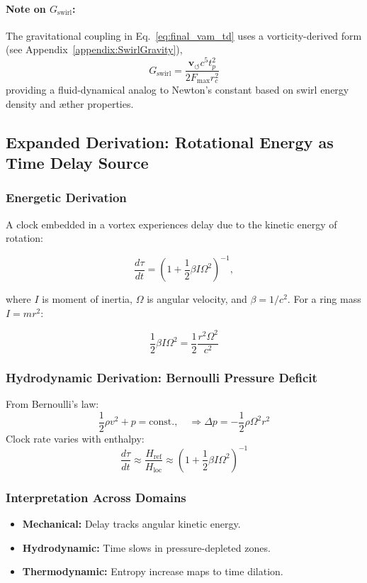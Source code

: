\documentclass[preprint]{revtex4-2}
\begin{document}
\paragraph{Note on $G_\text{swirl}$:}
The gravitational coupling in Eq.~\eqref{eq:final_vam_td} uses a vorticity-derived form (see Appendix~\ref{appendix:SwirlGravity}),
\[
    G_\text{swirl} = \frac{\mathbf{v}_{\scriptscriptstyle\boldsymbol{\circlearrowleft}} c^5 t_p^2}{2 F_{\text{max}} r_c^2}
\]
providing a fluid-dynamical analog to Newton's constant based on swirl energy density and æther properties.


\subsection{Expanded Derivation: Rotational Energy as Time Delay Source}

\subsubsection{Energetic Derivation}

A clock embedded in a vortex experiences delay due to the kinetic energy of rotation:

\begin{equation}
    \frac{d\tau}{dt} = \left(1 + \frac{1}{2} \beta I \Omega^2 \right)^{-1},
\end{equation}

where $I$ is moment of inertia, $\Omega$ is angular velocity, and $\beta = 1/c^2$. For a ring mass $I = m r^2$:

\[
    \frac{1}{2} \beta I \Omega^2 = \frac{1}{2} \frac{r^2 \Omega^2}{c^2}
\]

\subsubsection{Hydrodynamic Derivation: Bernoulli Pressure Deficit}

From Bernoulli's law:
\[
    \frac{1}{2} \rho v^2 + p = \text{const.}, \quad \Rightarrow \Delta p = -\frac{1}{2} \rho \Omega^2 r^2
\]
Clock rate varies with enthalpy:
\[
    \frac{d\tau}{dt} \approx \frac{H_\text{ref}}{H_\text{loc}} \approx \left(1 + \frac{1}{2} \beta I \Omega^2 \right)^{-1}
\]

\subsubsection{Interpretation Across Domains}
\begin{itemize}
    \item \textbf{Mechanical:} Delay tracks angular kinetic energy.
    \item \textbf{Hydrodynamic:} Time slows in pressure-depleted zones.
    \item \textbf{Thermodynamic:} Entropy increase maps to time dilation.
\end{itemize}
\end{document}
